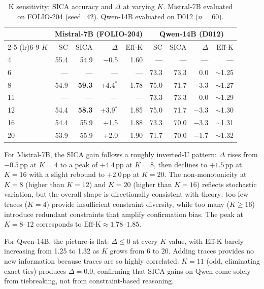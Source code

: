 \documentclass[11pt,a4paper]{article}
\newcommand{\effk}{\text{Eff-K}}
\begin{document}
\begin{table}[t]
\centering
\caption{K sensitivity: SICA accuracy and $\Delta$ at varying $K$. Mistral-7B evaluated on FOLIO-204 (seed=42). Qwen-14B evaluated on D012 ($n=60$).}
\label{tab:ksens}
\small
\begin{tabular}{lrrrr|rrrr}
\toprule
& \multicolumn{4}{c}{\textbf{Mistral-7B (FOLIO-204)}} & \multicolumn{4}{c}{\textbf{Qwen-14B (D012)}} \\
\cmidrule(lr){2-5} \cmidrule(lr){6-9}
$K$ & SC & SICA & $\Delta$ & $\effk$ & SC & SICA & $\Delta$ & $\effk$ \\
\midrule
4  & 55.4 & 54.9 & $-$0.5 & 1.60 & --- & --- & --- & --- \\
6  & --- & --- & --- & --- & 73.3 & 73.3 & 0.0 & $\sim$1.25 \\
8  & 54.9 & \textbf{59.3} & +4.4$^*$ & 1.78 & 75.0 & 71.7 & $-$3.3 & $\sim$1.27 \\
11 & --- & --- & --- & --- & 73.3 & 73.3 & 0.0 & $\sim$1.29 \\
12 & 54.4 & \textbf{58.3} & +3.9$^*$ & 1.85 & 75.0 & 71.7 & $-$3.3 & $\sim$1.30 \\
16 & 54.4 & 55.9 & +1.5 & 1.88 & 73.3 & 70.0 & $-$3.3 & $\sim$1.31 \\
20 & 53.9 & 55.9 & +2.0 & 1.90 & 71.7 & 70.0 & $-$1.7 & $\sim$1.32 \\
\bottomrule
\end{tabular}
\end{table}

For Mistral-7B, the SICA gain follows a roughly inverted-U pattern: $\Delta$ rises from $-0.5$\,pp at $K=4$ to a peak of $+4.4$\,pp at $K=8$, then declines to $+1.5$\,pp at $K=16$ with a slight rebound to $+2.0$\,pp at $K=20$. The non-monotonicity at $K=8$ (higher than $K=12$) and $K=20$ (higher than $K=16$) reflects stochastic variation, but the overall shape is directionally consistent with theory: too few traces ($K=4$) provide insufficient constraint diversity, while too many ($K \geq 16$) introduce redundant constraints that amplify confirmation bias. The peak at $K=8$--$12$ corresponds to $\effk \approx 1.78$--$1.85$.

For Qwen-14B, the picture is flat: $\Delta \leq 0$ at every $K$ value, with $\effk$ barely increasing from 1.25 to 1.32 as $K$ grows from 6 to 20. Adding traces provides no new information because traces are so highly correlated. $K=11$ (odd, eliminating exact ties) produces $\Delta = 0.0$, confirming that SICA gains on Qwen come solely from tiebreaking, not from constraint-based reasoning.
\end{document}
